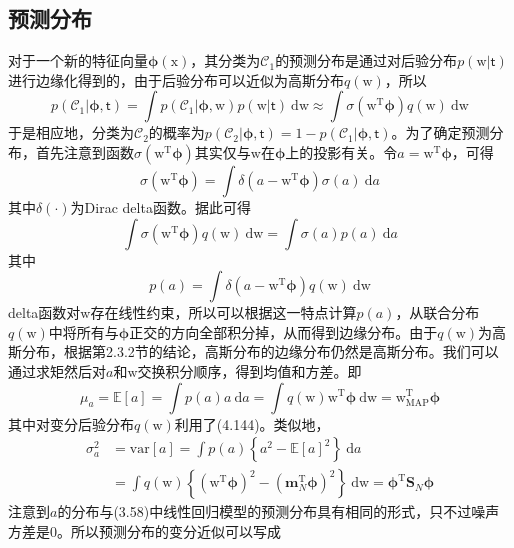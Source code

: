 \documentclass[b5paper]{book}
\numberwithin{equation}{chapter}
\newcommand {\bx} {\boldsymbol{\mathrm{x}}}
\newcommand {\bw} {\boldsymbol{\mathrm{w}}}
\newcommand {\sft} {\boldsymbol{\mathsf{t}}}
\newcommand {\rmT} {\mathrm{T}}
\newcommand {\rmd} {\mathrm{d}}
\newcommand {\bfphi} {\boldsymbol{\phi}}
\newcommand {\calC} {\mathcal{C}}
\begin{document}
	\subsection{预测分布}
	\textnormal{对于一个新的特征向量$\bfphi(\bx)$，其分类为$\calC_1$的预测分布是通过对后验分布$p(\bw|\sft)$进行边缘化得到的，由于后验分布可以近似为高斯分布$q(\bw)$，所以
	\begin{equation}
		p(\calC_1|\bfphi,\sft) = \int p(\calC_1|\bfphi,\bw) p(\bw|\sft)\ \rmd \bw \approx \int \sigma(\bw^{\rmT}\bfphi)q(\bw)\ \rmd \bw
	\end{equation}
	于是相应地，分类为$\calC_2$的概率为$p(\calC_2|\bfphi,\sft) = 1 - p(\calC_1|\bfphi,\sft)$。为了确定预测分布，首先注意到函数$\sigma(\bw^{\rmT}\bfphi)$其实仅与$\bw$在$\bfphi$上的投影有关。令$a = \bw^{\rmT} \bfphi$，可得
	\begin{equation}
		\sigma(\bw^{\rmT} \bfphi) = \int \delta(a - \bw^{\rmT} \bfphi)\sigma(a)\ \rmd a
	\end{equation}
	其中$\delta(\cdot)$为Dirac delta函数。据此可得
	\begin{equation}
		\int \sigma(\bw^{\rmT} \bfphi)q(\bw)\ \rmd \bw = \int \sigma(a)p(a)\ \rmd a
	\end{equation}
	其中
	\begin{equation}
		p(a) = \int \delta(a - \bw^{\rmT}\bfphi)q(\bw) \ \rmd \bw
	\end{equation}
	delta函数对$\bw$存在线性约束，所以可以根据这一特点计算$p(a)$，从联合分布$q(\bw)$中将所有与$\bfphi$正交的方向全部积分掉，从而得到边缘分布。由于$q(\bw)$为高斯分布，根据第2.3.2节的结论，高斯分布的边缘分布仍然是高斯分布。我们可以通过求矩然后对$a$和$\bw$交换积分顺序，得到均值和方差。即
	\begin{equation}
		\mu_a = \mathbb{E}[a] = \int p(a)a \ \rmd a = \int q(\bw) \bw^{\rmT} \bfphi \ \rmd \bw = \bw_{\mathrm{MAP}}^{\rmT}\bfphi
	\end{equation}
	其中对变分后验分布$q(\bw)$利用了(4.144)。类似地，
	\begin{equation}
	\begin{split}
		\sigma_a^2 &= \mathrm{var}[a] = \int p(a)\left\{a^2 - \mathbb{E}[a]^2\right\}\ \rmd a\\
		&= \int q(\bw) \left\{(\bw^{\rmT} \bfphi)^2 - (\mathbf{m}_N^{\rmT}\bfphi)^2\right\}\ \rmd \bw = \bfphi^{\rmT}\mathbf{S}_N\bfphi
	\end{split}
	\end{equation}
	注意到$a$的分布与(3.58)中线性回归模型的预测分布具有相同的形式，只不过噪声方差是0。所以预测分布的变分近似可以写成
	\begin{equation}

\end{equation}}
\end{document}
